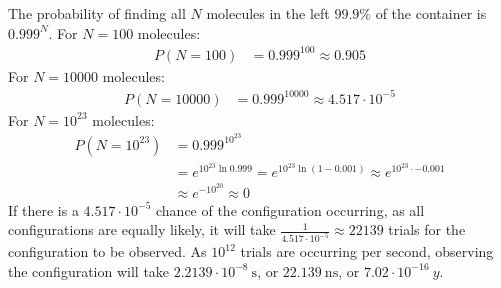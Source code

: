 \documentclass{article}
\begin{document}
The probability of finding all $N$ molecules in the left $99.9\%$ of the container is $0.999^N$. For $N = 100$ molecules:
\begin{equation}
    \begin{split}
        P\left(N = 100\right) & = 0.999^{100} \approx 0.905
    \end{split}
\end{equation}
For $N = 10000$ molecules:
\begin{equation}
    \begin{split}
        P\left(N = 10000\right) & = 0.999^{10000} \approx 4.517 \cdot 10^{-5}
    \end{split}
\end{equation}
For $N = 10^{23}$ molecules:
\begin{equation}
    \begin{split}
        P\left(N = 10^{23}\right) & = 0.999^{10^{23}} \\
        & = e^{10^{23}\ln 0.999} = e^{10^{23}\ln\left(1 - 0.001\right)} \approx e^{10^{23} \cdot -0.001} \\
        & \approx e^{-10^{20}} \approx 0
    \end{split}
\end{equation}
If there is a $4.517 \cdot 10^{-5}$ chance of the configuration occurring, as all configurations are equally likely, it will take $\frac{1}{4.517 \cdot 10^{-5}} \approx 22139$ trials for the configuration to be observed. As $10^{12}$ trials are occurring per second, observing the configuration will take $2.2139 \cdot 10^{-8}~\unit{\second}$, or $22.139~\unit{\nano\second}$, or $7.02 \cdot 10^{-16}~\unit{y}$.

\clearpage
\end{document}
